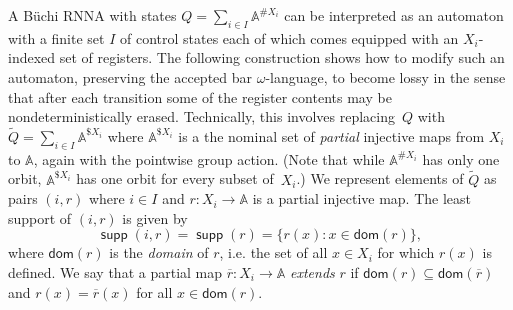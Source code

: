 \documentclass[final,a4paper,UKenglish,thm-restate,autoref,numberwithinsect]{lipics-v2021}
\newcommand{\compr}{:}
\numberwithin{equation}{section}
\newcommand{\ol}{\overline}
\newcommand{\seq}{\subseteq}
\newcommand{\tl}{\widetilde}
\newcommand{\dom}{\mathsf{dom}}
\newcommand{\+}[1]{\mathcal{#1}\xspace}
\newcommand{\names}{\mathbb{A}}
\DeclareMathOperator{\supp}{\mathsf{supp}} %
\theoremstyle{definition}
\begin{document}
\noindent A Büchi RNNA with states $Q=\sum_{i\in I} \names^{\# X_i}$ can be
interpreted as an automaton with a finite set $I$ of control states
each of which comes equipped with an $X_i$-indexed set of
registers. The following construction shows how to modify such an
automaton, preserving the accepted bar $\omega$-language, to become lossy in the
sense that after each transition some of the register contents may be
nondeterministically erased. Technically, this involves replacing~$Q$
with $\tl{Q}=\sum_{i\in I} \names^{\$ X_i}$ where $\names^{\$ X_i}$ is
a the nominal set of \emph{partial} injective maps from $X_i$ to
$\names$, again with the pointwise group action. (Note that while
$\names^{\# X_i}$ has only one orbit, $\names^{\$ X_i}$ has one orbit
for every subset of~$X_i$.) We represent elements of $\tl{Q}$ as pairs
$(i,r)$ where $i\in I$ and $r\colon X_i\to \names$ is a partial
injective map. The least support of $(i,r)$ is given by
\[
  \supp(i,r) = \supp(r) = \{ r(x) \compr x\in  \dom(r)\},
\]
where $\dom(r)$ is the \emph{domain} of $r$, i.e. the set of all
$x\in X_i$ for which $r(x)$ is defined. We say that a partial map
$\ol{r}\colon X_i\to \names$ \emph{extends} $r$ if
$\dom(r)\seq \dom(\ol{r})$ and $r(x)=\ol{r}(x)$ for all
$x\in \dom(r)$.
\end{document}
